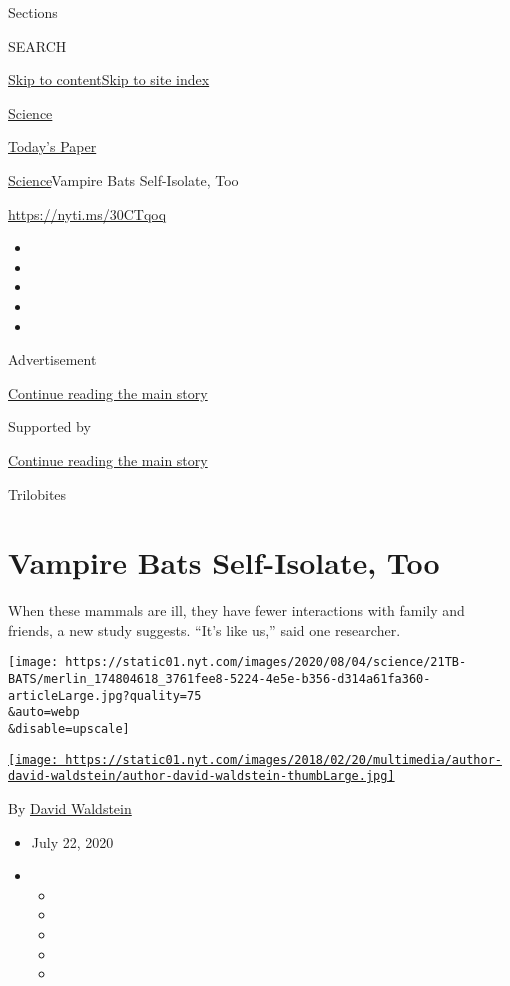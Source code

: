 Sections

SEARCH

\protect\hyperlink{site-content}{Skip to
content}\protect\hyperlink{site-index}{Skip to site index}

\href{https://www.nytimes.com/section/science}{Science}

\href{https://myaccount.nytimes.com/auth/login?response_type=cookie\&client_id=vi}{}

\href{https://www.nytimes.com/section/todayspaper}{Today's Paper}

\href{/section/science}{Science}\textbar{}Vampire Bats Self-Isolate, Too

\url{https://nyti.ms/30CTqoq}

\begin{itemize}
\item
\item
\item
\item
\item
\end{itemize}

Advertisement

\protect\hyperlink{after-top}{Continue reading the main story}

Supported by

\protect\hyperlink{after-sponsor}{Continue reading the main story}

Trilobites

\hypertarget{vampire-bats-self-isolate-too}{%
\section{Vampire Bats Self-Isolate,
Too}\label{vampire-bats-self-isolate-too}}

When these mammals are ill, they have fewer interactions with family and
friends, a new study suggests. ``It's like us,'' said one researcher.

\texttt{[image: https://static01.nyt.com/images/2020/08/04/science/21TB-BATS/merlin\_174804618\_3761fee8-5224-4e5e-b356-d314a61fa360-articleLarge.jpg?quality=75\\\&auto=webp\\\&disable=upscale]}

\href{https://www.nytimes.com/by/david-waldstein}{\texttt{[image: https://static01.nyt.com/images/2018/02/20/multimedia/author-david-waldstein/author-david-waldstein-thumbLarge.jpg]}}

By \href{https://www.nytimes.com/by/david-waldstein}{David Waldstein}

\begin{itemize}
\item
  July 22, 2020
\item
  \begin{itemize}
  \item
  \item
  \item
  \item
  \item
  \end{itemize}
\end{itemize}

